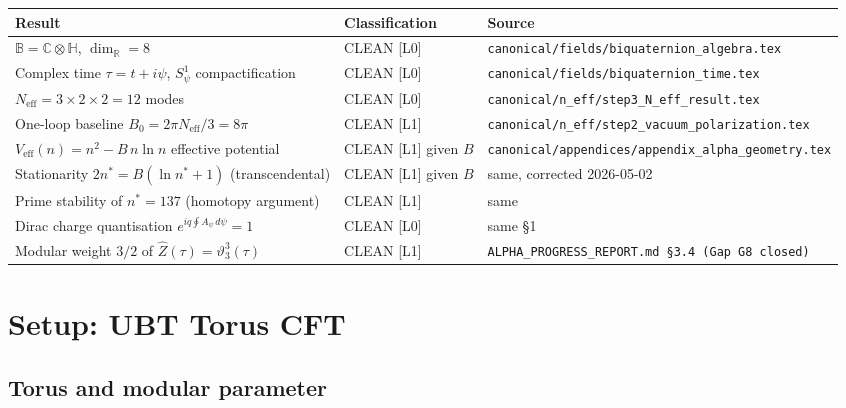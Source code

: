 \documentclass[12pt,a4paper]{article}
\theoremstyle{definition}
\theoremstyle{remark}
\newcommand{\vth}{\vartheta}
\begin{document}
\begin{tcolorbox}[colback=green!5!white,colframe=green!50!black,
  title=Pre-Proved Results (CLEAN)]
\begin{center}
\begin{tabular}{lll}
\toprule
\textbf{Result} & \textbf{Classification} & \textbf{Source} \\
\midrule
$\mathbb{B} = \mathbb{C}\otimes\mathbb{H}$, $\dim_{\mathbb{R}} = 8$ &
  CLEAN [L0] & \texttt{canonical/fields/biquaternion\_algebra.tex} \\
Complex time $\tau = t + i\psi$, $S^1_\psi$ compactification &
  CLEAN [L0] & \texttt{canonical/fields/biquaternion\_time.tex} \\
$N_{\mathrm{eff}} = 3\times 2\times 2 = 12$ modes &
  CLEAN [L0] & \texttt{canonical/n\_eff/step3\_N\_eff\_result.tex} \\
One-loop baseline $B_0 = 2\pi N_{\mathrm{eff}}/3 = 8\pi$ &
  CLEAN [L1] & \texttt{canonical/n\_eff/step2\_vacuum\_polarization.tex} \\
$V_{\mathrm{eff}}(n) = n^2 - B\,n\ln n$ effective potential &
  CLEAN [L1] given $B$ & \texttt{canonical/appendices/appendix\_alpha\_geometry.tex} \\
Stationarity $2n^* = B(\ln n^* + 1)$ (transcendental) &
  CLEAN [L1] given $B$ & same, corrected 2026-05-02 \\
Prime stability of $n^* = 137$ (homotopy argument) &
  CLEAN [L1] & same \\
Dirac charge quantisation $e^{iq\oint A_\psi\,d\psi} = 1$ &
  CLEAN [L0] & same §1 \\
Modular weight $3/2$ of $\hat{Z}(\tau) = \vth_3^3(\tau)$ &
  CLEAN [L1] & \texttt{ALPHA\_PROGRESS\_REPORT.md §3.4 (Gap G8 closed)} \\
\bottomrule
\end{tabular}
\end{center}
\end{tcolorbox}

\section{Setup: UBT Torus CFT}
\label{sec:setup}

\subsection{Torus and modular parameter}
\end{document}

